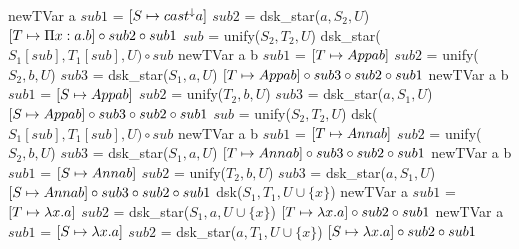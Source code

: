 \begin{algorithm}
\begin{multicols}{2}
\begin{algorithmic}[1]
        \State newTVar a
        \State $sub1$ = $[S\mapsto cast^\downarrow a ]$
        \State $sub2$ = dsk\_star($a, S_2, U$)
        \State \Return $ [T\mapsto\Pi x:a. b ] \circ sub2 \circ sub1$
        \State $sub$ = unify($S_2, T_2, U$)
        \State dsk\_star($S_1[sub], T_1[sub], U) \circ sub $
        \State newTVar a b
        \State $sub1$ = $[T\mapsto App a b ]$
        \State $sub2$ = unify($S_2, b, U$)
        \State $sub3$ = dsk\_star($S_1, a, U$)
        \State \Return $ [T\mapsto App a b ] \circ sub3 \circ sub2 \circ sub1$
        \State newTVar a b
        \State $sub1$ = $[S\mapsto App a b ]$
        \State $sub2$ = unify($T_2, b, U$)
        \State $sub3$ = dsk\_star($a, S_1, U$)
        \State \Return $ [S\mapsto App a b ] \circ sub3 \circ sub2 \circ sub1$
        \State $sub$ = unify($S_2, T_2, U$)
        \State dsk($S_1[sub], T_1[sub], U) \circ sub $
        \State newTVar a b
        \State $sub1$ = $[T\mapsto Ann a b ]$
        \State $sub2$ = unify($S_2, b, U$)
        \State $sub3$ = dsk\_star($S_1, a, U$)
        \State \Return $ [T\mapsto Ann a b ] \circ sub3 \circ sub2 \circ sub1$
        \State newTVar a b
        \State $sub1$ = $[S\mapsto Ann a b ]$
        \State $sub2$ = unify($T_2, b, U$)
        \State $sub3$ = dsk\_star($a, S_1, U$)
        \State \Return $ [S\mapsto Ann a b ] \circ sub3 \circ sub2 \circ sub1$
        \State dsk($S_1, T_1, U \cup \{x\}$)
        \State newTVar a
        \State $sub1$ = $[T\mapsto\lambda x. a ]$
        \State $sub2$ = dsk\_star($S_1, a, U \cup \{x\}$)
        \State \Return $ [T\mapsto\lambda x. a ] \circ sub2 \circ sub1$
        \State newTVar a
        \State $sub1$ = $[S\mapsto\lambda x. a ]$
        \State $sub2$ = dsk\_star($a, T_1, U \cup \{x\}$)
        \State \Return $ [S\mapsto\lambda x. a ] \circ sub2 \circ sub1$

\end{algorithmic}
\end{multicols}
\end{algorithm}
